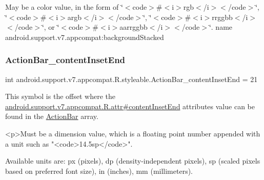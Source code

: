 May be a color value, in the form of \char`\"{}$<$code$>$\#$<$i$>$rgb$<$/i$>$$<$/code$>$\char`\"{}, \char`\"{}$<$code$>$\#$<$i$>$argb$<$/i$>$$<$/code$>$\char`\"{}, \char`\"{}$<$code$>$\#$<$i$>$rrggbb$<$/i$>$$<$/code$>$\char`\"{}, or \char`\"{}$<$code$>$\#$<$i$>$aarrggbb$<$/i$>$$<$/code$>$\char`\"{}.  name android.\+support.\+v7.\+appcompat\+:background\+Stacked \mbox{\label{classandroid_1_1support_1_1v7_1_1appcompat_1_1R_1_1styleable_a65308af43525946cf793f406019f7925}} 
\subsubsection{\texorpdfstring{Action\+Bar\+\_\+content\+Inset\+End}{ActionBar\_contentInsetEnd}}
{\footnotesize\ttfamily int android.\+support.\+v7.\+appcompat.\+R.\+styleable.\+Action\+Bar\+\_\+content\+Inset\+End = 21\hspace{0.3cm}{\ttfamily [static]}}

This symbol is the offset where the \hyperlink{classandroid_1_1support_1_1v7_1_1appcompat_1_1R_1_1attr_a0de2c511147e44102ccb77312c667d73}{android.\+support.\+v7.\+appcompat.\+R.\+attr\#content\+Inset\+End} attribute\textquotesingle{}s value can be found in the \hyperlink{classandroid_1_1support_1_1v7_1_1appcompat_1_1R_1_1styleable_a5941dc15714398e9ec9afaa0155cc1cf}{Action\+Bar} array.

\begin{DoxyVerb}      <p>Must be a dimension value, which is a floating point number appended with a unit such as "<code>14.5sp</code>".
\end{DoxyVerb}
 Available units are\+: px (pixels), dp (density-\/independent pixels), sp (scaled pixels based on preferred font size), in (inches), mm (millimeters). 

